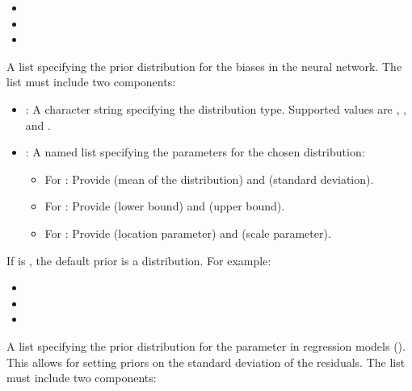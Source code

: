 \documentclass[a4paper]{book}
\begin{document}
\begin{Arguments}
\begin{ldescription}
\begin{itemize}
\item{} 
\item{} 
\item{} 

\end{itemize}


\item[\code{prior\_bias}] A list specifying the prior distribution for the biases in the neural network.
The list must include two components:
\begin{itemize}

\item{} : A character string specifying the distribution type. Supported values are
, , and .
\item{} : A named list specifying the parameters for the chosen distribution:
\begin{itemize}

\item{} For : Provide  (mean of the distribution) and  (standard deviation).
\item{} For : Provide  (lower bound) and  (upper bound).
\item{} For : Provide  (location parameter) and  (scale parameter).

\end{itemize}


\end{itemize}

If  is , the default prior is a  distribution.
For example:
\begin{itemize}

\item{} 
\item{} 
\item{} 

\end{itemize}


\item[\code{prior\_sigma}] A list specifying the prior distribution for the  parameter in regression
models (). This allows for setting priors on the standard deviation of the residuals.
The list must include two components:
\begin{itemize}


\end{itemize}
\end{ldescription}
\end{Arguments}
\end{document}
